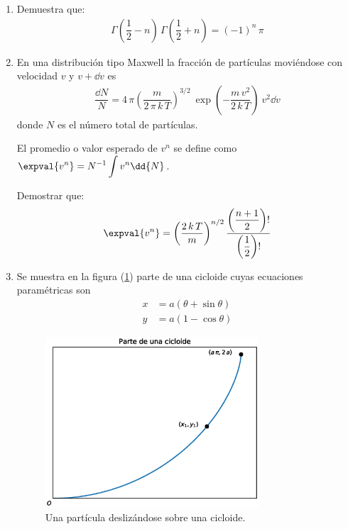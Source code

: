 \begin{enumerate}
\item  Demuestra que:
\begin{align*}
\Gamma \left( \dfrac{1}{2} - n \right) \, \Gamma \left( \dfrac{1}{2} + n \right) = (-1)^{n} \, \pi
\end{align*}
\item En una distribución tipo Maxwell la fracción de partículas moviéndose con velocidad $v$ y $v +\dd{v}$ es
\begin{align*}
\dfrac{\dd{N}}{N} = 4 \, \pi \left( \dfrac{m}{2 \, \pi \, k \, T} \right)^{3/2} \: \exp \left( - \dfrac{m \, v^{2}}{2 \, k \, T} \right) \: v^{2} \dd{v}
\end{align*}
donde $N$ es el número total de partículas. 
\par
El promedio o valor esperado de $v^{n}$ se define como $\displaystyle \expval{v^{n}} = N^{-1} \int v^{n} \dd{N}$.
\par
Demostrar que:
\begin{align*}
\expval{v^{n}} = \left( \dfrac{2 \, k \, T}{m} \right)^{n/2} \dfrac{\left( \dfrac{n + 1}{2} \right) !} { \left( \dfrac{1}{2} \right) !}
\end{align*}
\item Se muestra en la figura (\ref{fig:figura_cicloide}) parte de una cicloide cuyas ecuaciones paramétricas son
\begin{align*}
x &= a (\theta + \sin \theta) \\[0.5em]
y &= a (1 - \cos \theta)
\end{align*}
\begin{figure}[H]
    \centering
    \includegraphics[width=0.75\textwidth]{Imagenes/plot_cicloide.eps}
    \caption{Una partícula deslizándose sobre una cicloide.}
    \label{fig:figura_cicloide}
\end{figure}


\end{enumerate}
